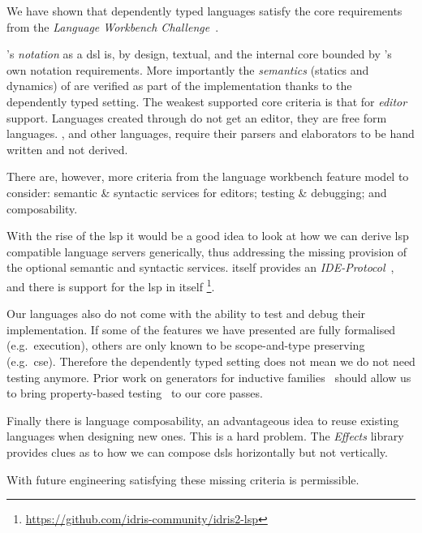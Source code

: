 
We have shown that dependently typed languages satisfy the core requirements from the \emph{Language Workbench Challenge}~\cite{DBLP:conf/sle/ErdwegSVBBCGHKLKMPPSSSVVVWW13}.

\Velo{}'s \emph{notation} as a \ac{dsl} is, by design, textual, and the internal core bounded by \Idris{}'s own notation requirements.
%
More importantly the \emph{semantics} (statics and dynamics) of \Velo{}
are verified as part of the implementation thanks to the dependently typed setting.
%
The weakest supported core criteria is that for \emph{editor} support.
%
Languages created through \Idris{} do not get an editor, they are free form languages.
\Velo{}, and other languages, require their parsers and elaborators to be hand written and not derived.

%
There are, however, more criteria from the language workbench feature model to consider:
%
semantic \& syntactic services for editors;
%
testing \& debugging;
%
and
%
composability.
%

With the rise of the \ac{lsp} it would be a good idea to look at how we can derive \ac{lsp} compatible language servers generically, thus addressing the missing provision of the optional semantic and syntactic services.
\Idris{} itself provides an \emph{IDE-Protocol}~\cite{MANUAL:dtp/Christiansen2014}, and there is support for the \ac{lsp} in \Idris{} itself
\footnote{\url{https://github.com/idris-community/idris2-lsp}}.

Our languages also do not come with the ability to test and debug their
implementation.
%
If some of the features we have presented are fully formalised (e.g.\ execution),
others are only known to be scope-and-type preserving (e.g.\ \ac{cse}).
%
Therefore the dependently typed setting does not mean we do not need testing
anymore.
%
Prior work on generators for inductive families~\cite{DBLP:journals/pacmpl/LampropoulosPP18}
should allow us to bring property-based testing~\cite{DBLP:conf/icfp/ClaessenH00} to our core passes.

Finally there is language composability, an advantageous idea to reuse existing languages when designing new ones.
This is a hard problem.
The \emph{Effects} library~\cite{DBLP:conf/icfp/Brady13} provides clues as to how we can compose \acp{dsl} horizontally but not vertically.

With future engineering satisfying these missing criteria is permissible.


